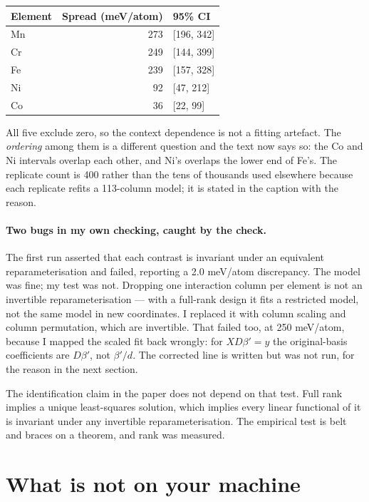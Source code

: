 \documentclass[11pt]{article}
\begin{document}
\begin{center}
\begin{tabular}{lrl}
\toprule
Element & Spread (meV/atom) & 95\% CI \\
\midrule
Mn & 273 & [196, 342] \\
Cr & 249 & [144, 399] \\
Fe & 239 & [157, 328] \\
Ni & \phantom{0}92 & [47, 212] \\
Co & \phantom{0}36 & [22, 99] \\
\bottomrule
\end{tabular}
\end{center}

All five exclude zero, so the context dependence is not a fitting artefact. The
\emph{ordering} among them is a different question and the text now says so: the Co and Ni
intervals overlap each other, and Ni's overlaps the lower end of Fe's. The replicate count
is 400 rather than the tens of thousands used elsewhere because each replicate refits a
113-column model; it is stated in the caption with the reason.

\paragraph{Two bugs in my own checking, caught by the check.} The first run asserted that
each contrast is invariant under an equivalent reparameterisation and failed, reporting a
2.0 meV/atom discrepancy. The model was fine; my test was not. Dropping one interaction
column per element is not an invertible reparameterisation --- with a full-rank design it
fits a restricted model, not the same model in new coordinates. I replaced it with column
scaling and column permutation, which are invertible. That failed too, at 250 meV/atom,
because I mapped the scaled fit back wrongly: for $XD\beta' = y$ the original-basis
coefficients are $D\beta'$, not $\beta'/d$. The corrected line is written but was not run,
for the reason in the next section.

The identification claim in the paper does not depend on that test. Full rank implies a
unique least-squares solution, which implies every linear functional of it is invariant
under any invertible reparameterisation. The empirical test is belt and braces on a
theorem, and rank was measured.

\section*{What is not on your machine}
\end{document}
